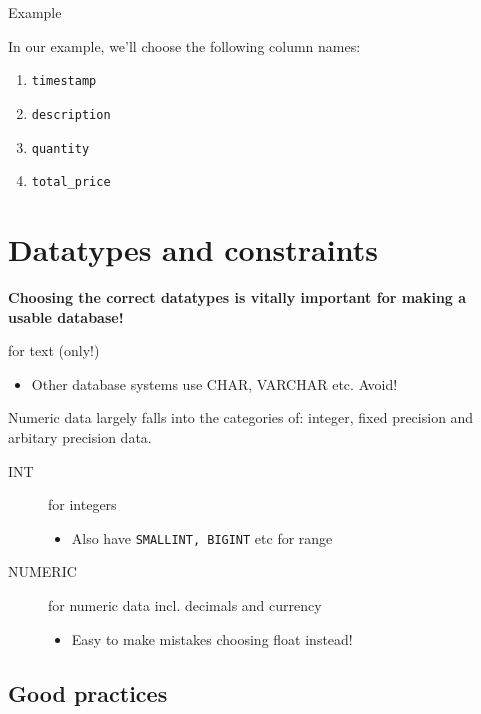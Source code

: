 \documentclass[slides]{pgnotes}
\begin{document}
\newpage

\begin{greenbox}{Example}

  In our example, we'll choose the following column names:

  \begin{enumerate}
  \item \texttt{timestamp}
  \item \texttt{description}
  \item \texttt{quantity}
  \item \texttt{total\_price}
  \end{enumerate}

\end{greenbox}

\section{Datatypes and constraints} 

\textbf{Choosing the correct datatypes is vitally important for making a usable database!}

\begin{description}
\item[TEXT] for text (only!)
  \begin{itemize}
  \item Other database systems use CHAR, VARCHAR etc. Avoid!
  \end{itemize}
\item Numeric data largely falls into the categories of: integer, fixed precision and arbitary precision data.
  \begin{description}
  \item[INT] for integers
    \begin{itemize}
    \item Also have \texttt{SMALLINT, BIGINT} etc for range
    \end{itemize}
  \item[NUMERIC] for numeric data incl. decimals and currency
    \begin{itemize}
    \item Easy to make mistakes choosing float instead!
    \end{itemize}
  \end{description}
\end{description}

\subsection{Good practices}
\end{document}
